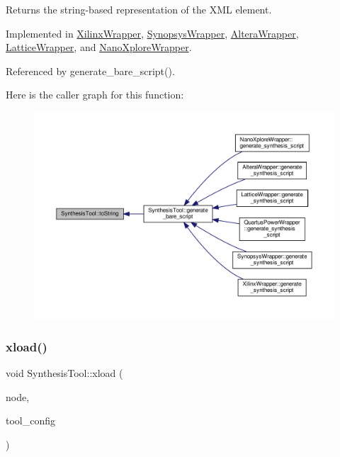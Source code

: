 Returns the string-\/based representation of the X\+ML element. 



Implemented in \hyperlink{classXilinxWrapper_abda54a2f377b1570bf7c045713557edf}{Xilinx\+Wrapper}, \hyperlink{classSynopsysWrapper_abdd13f9bc68c225978b5a29ac6250df2}{Synopsys\+Wrapper}, \hyperlink{classAlteraWrapper_a0e6e4558b643ccd1ba0179c4e5d470d8}{Altera\+Wrapper}, \hyperlink{classLatticeWrapper_a0c5cd7306773dc6c6e0250141f78760c}{Lattice\+Wrapper}, and \hyperlink{classNanoXploreWrapper_ac21600c8f4e069a14f07a91560caf0c1}{Nano\+Xplore\+Wrapper}.



Referenced by generate\+\_\+bare\+\_\+script().

Here is the caller graph for this function\+:
\nopagebreak
\begin{figure}[H]
\begin{center}
\leavevmode
\includegraphics[width=350pt]{d9/de0/classSynthesisTool_a98c5ba46f950300e1a5ca7cfcb409852_icgraph}
\end{center}
\end{figure}
\mbox{\label{classSynthesisTool_a7f73cdb803166570cad3f9959188cf4f}} 
\subsubsection{\texorpdfstring{xload()}{xload()}}
{\footnotesize\ttfamily void Synthesis\+Tool\+::xload (\begin{DoxyParamCaption}\item[{const \hyperlink{classxml__element}{xml\+\_\+element} $\ast$}]{node,  }\item[{const std\+::string \&}]{tool\+\_\+config }\end{DoxyParamCaption})}



